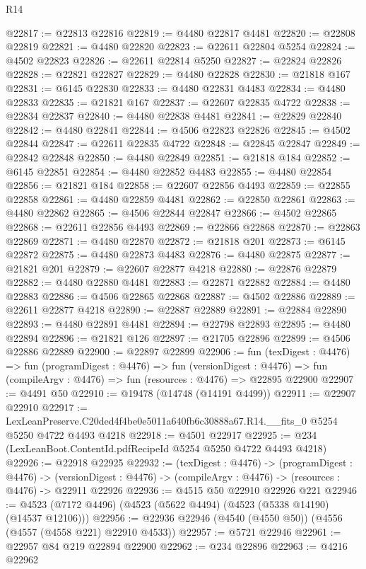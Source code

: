 \begin{lexlean}{R14}
\begin{coremodule}
@22817 := @22813 @22816
@22819 := @4480 @22817 @4481
@22820 := @22808 @22819
@22821 := @4480 @22820
@22823 := @22611 @22804 @5254
@22824 := @4502 @22823
@22826 := @22611 @22814 @5250
@22827 := @22824 @22826
@22828 := @22821 @22827
@22829 := @4480 @22828
@22830 := @21818 @167
@22831 := @6145 @22830
@22833 := @4480 @22831 @4483
@22834 := @4480 @22833
@22835 := @21821 @167
@22837 := @22607 @22835 @4722
@22838 := @22834 @22837
@22840 := @4480 @22838 @4481
@22841 := @22829 @22840
@22842 := @4480 @22841
@22844 := @4506 @22823 @22826
@22845 := @4502 @22844
@22847 := @22611 @22835 @4722
@22848 := @22845 @22847
@22849 := @22842 @22848
@22850 := @4480 @22849
@22851 := @21818 @184
@22852 := @6145 @22851
@22854 := @4480 @22852 @4483
@22855 := @4480 @22854
@22856 := @21821 @184
@22858 := @22607 @22856 @4493
@22859 := @22855 @22858
@22861 := @4480 @22859 @4481
@22862 := @22850 @22861
@22863 := @4480 @22862
@22865 := @4506 @22844 @22847
@22866 := @4502 @22865
@22868 := @22611 @22856 @4493
@22869 := @22866 @22868
@22870 := @22863 @22869
@22871 := @4480 @22870
@22872 := @21818 @201
@22873 := @6145 @22872
@22875 := @4480 @22873 @4483
@22876 := @4480 @22875
@22877 := @21821 @201
@22879 := @22607 @22877 @4218
@22880 := @22876 @22879
@22882 := @4480 @22880 @4481
@22883 := @22871 @22882
@22884 := @4480 @22883
@22886 := @4506 @22865 @22868
@22887 := @4502 @22886
@22889 := @22611 @22877 @4218
@22890 := @22887 @22889
@22891 := @22884 @22890
@22893 := @4480 @22891 @4481
@22894 := @22798 @22893
@22895 := @4480 @22894
@22896 := @21821 @126
@22897 := @21705 @22896
@22899 := @4506 @22886 @22889
@22900 := @22897 @22899
@22906 := fun (texDigest : @4476) =>
  fun (programDigest : @4476) =>
  fun (versionDigest : @4476) =>
  fun (compileArgv : @4476) => fun (resources : @4476) => @22895 @22900
@22907 := @4491 @50
@22910 := @19478 (@14748 (@14191 @4499))
@22911 := @22907 @22910
@22917 := LexLeanPreserve.C20ded4f4be0e5011a640fb6c30888a67.R14.__fits_0
    @5254
    @5250
    @4722
    @4493
    @4218
@22918 := @4501 @22917
@22925 := @234 (LexLeanBoot.ContentId.pdfRecipeId @5254 @5250 @4722 @4493 @4218)
@22926 := @22918 @22925
@22932 := (texDigest : @4476) ->
  (programDigest : @4476) ->
  (versionDigest : @4476) -> (compileArgv : @4476) -> (resources : @4476) -> @22911 @22926
@22936 := @4515 @50 @22910 @22926 @221
@22946 := @4523 (@7172 @4496) (@4523 (@5622 @4494) (@4523 (@5338 @14190) (@14537 @12106)))
@22956 := @22936 @22946 (@4540 (@4550 @50)) (@4556 (@4557 (@4558 @221) @22910 @4533))
@22957 := @5721 @22946
@22961 := @22957 @84 @219 @22894 @22900
@22962 := @234 @22896
@22963 := @4216 @22962

\end{coremodule}
\end{lexlean}
